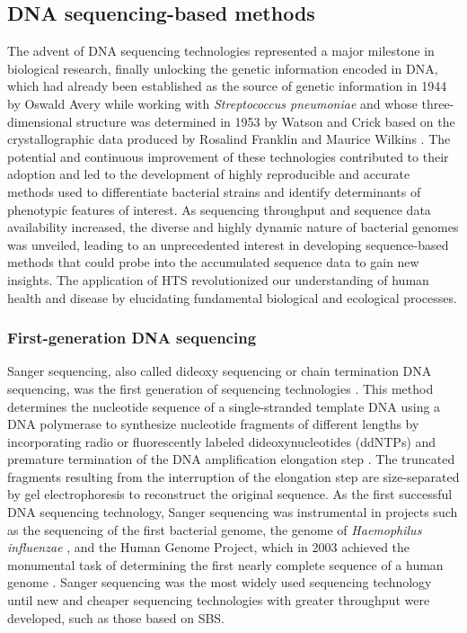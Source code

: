 \subsection{DNA sequencing-based methods}

The advent of \ac{DNA} sequencing technologies represented a major milestone in biological research, finally unlocking the genetic information encoded in \ac{DNA}, which had already been established as the source of genetic information in 1944 by Oswald Avery while working with \textit{Streptococcus pneumoniae} \cite{avery_studies_1944} and whose three-dimensional structure was determined in 1953 by Watson and Crick based on the crystallographic data produced by Rosalind Franklin and Maurice Wilkins \cite{watson_molecular_1953, zallen_despite_2003}. The potential and continuous improvement of these technologies contributed to their adoption and led to the development of highly reproducible and accurate methods used to differentiate bacterial strains and identify determinants of phenotypic features of interest. As sequencing throughput and sequence data availability increased, the diverse and highly dynamic nature of bacterial genomes was unveiled, leading to an unprecedented interest in developing sequence-based methods that could probe into the accumulated sequence data to gain new insights. The application of \ac{HTS} revolutionized our understanding of human health and disease by elucidating fundamental biological and ecological processes.

\subsubsection{First-generation DNA sequencing}

Sanger sequencing, also called dideoxy sequencing or chain termination \ac{DNA} sequencing, was the first generation of sequencing technologies \cite{sanger_dna_1977}. This method determines the nucleotide sequence of a single-stranded template \ac{DNA} using a \ac{DNA} polymerase to synthesize nucleotide fragments of different lengths by incorporating radio or fluorescently labeled dideoxynucleotides (ddNTPs) and premature termination of the DNA amplification elongation step \cite{heather_sequence_2016, rodriguez_genesis_2023}. The truncated fragments resulting from the interruption of the elongation step are size-separated by gel electrophoresis to reconstruct the original sequence. As the first successful \ac{DNA} sequencing technology, Sanger sequencing was instrumental in projects such as the sequencing of the first bacterial genome, the genome of \textit{Haemophilus influenzae} \cite{fleischmann_whole-genome_1995}, and the Human Genome Project, which in 2003 achieved the monumental task of determining the first nearly complete sequence of a human genome \cite{international_human_genome_sequencing_consortium_finishing_2004}.
Sanger sequencing was the most widely used sequencing technology until new and cheaper sequencing technologies with greater throughput were developed, such as those based on \ac{SBS}.

